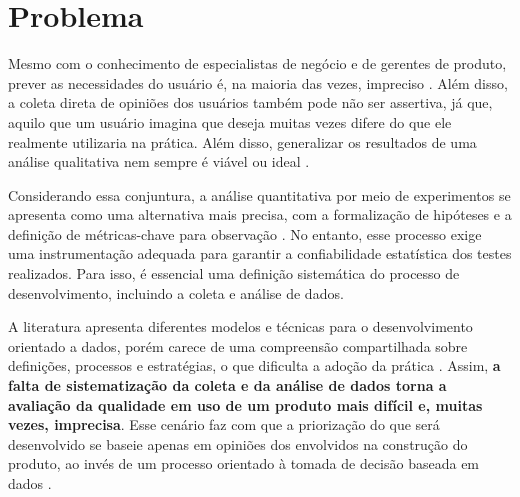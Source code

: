 \section{Problema}

Mesmo com o conhecimento de especialistas de negócio e de gerentes de produto, prever as necessidades do usuário é, na maioria das vezes, impreciso \cite{castellion2008do}. Além disso, a coleta direta de opiniões dos usuários também pode não ser assertiva, já que, aquilo que um usuário imagina que deseja muitas vezes difere do que ele realmente utilizaria na prática. Além disso, generalizar os resultados de uma análise qualitativa nem sempre é viável ou ideal \cite{cao2008agile}.

Considerando essa conjuntura, a análise quantitativa por meio de experimentos se apresenta como uma alternativa mais precisa, com a formalização de hipóteses e a definição de métricas-chave para observação \cite{kohavi_oce_and_ab_tests_2017}. No entanto, esse processo exige uma instrumentação adequada para garantir a confiabilidade estatística dos testes realizados. Para isso, é essencial uma definição sistemática do processo de desenvolvimento, incluindo a coleta e análise de dados.

A literatura apresenta diferentes modelos e técnicas para o desenvolvimento orientado a dados, porém carece de uma compreensão compartilhada sobre definições, processos e estratégias, o que dificulta a adoção da prática \cite{quin_b_2024}. Assim, \textbf{a falta de sistematização da coleta e da análise de dados torna a avaliação da qualidade em uso de um produto mais difícil e, muitas vezes, imprecisa}. Esse cenário faz com que a priorização do que será desenvolvido se baseie apenas em opiniões dos envolvidos na construção do produto, ao invés de um processo orientado à tomada de decisão baseada em dados \cite{olsson_opinions_2014}.